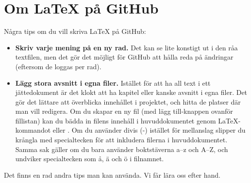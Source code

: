 \section{Om LaTeX på GitHub}

Några tips om du vill skriva LaTeX på GitHub:

\begin{itemize}

\item \textbf{Skriv varje mening på en ny rad.}
Det kan se lite konstigt ut i den råa textfilen, men det gör det möjligt för GitHub att hålla reda på ändringar (eftersom de loggas per rad).
\item \textbf{Lägg stora avsnitt i egna filer.}
Istället för att ha all text i ett jättedokument är det klokt att ha kapitel eller kanske avsnitt i egna filer.
Det gör det lättare att överblicka innehållet i projektet, och hitta de platser där man vill redigera.
Om du skapar en ny fil (med lägg till-knappen ovanför fillistan) kan du bädda in filens innehåll i huvuddokumentet genom LaTeX-kommandot \verb++ eller \verb++.
Om du använder divis (-) istället för mellanslag slipper du krångla med specialtecken för att inkludera filerna i huvuddokumentet.
Samma sak gäller om du bara använder boktstäverna a--z och A--Z, och undviker specialtecken som å, ä och ö i filnamnet.

\end{itemize}

Det finns en rad andra tips man kan använda. Vi får lära oss efter hand.
